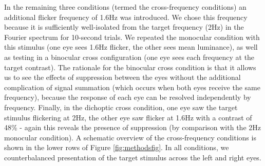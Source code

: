 \documentclass[
]{article}
\begin{document}
In the remaining three conditions (termed the cross-frequency conditions) an additional flicker frequency of 1.6Hz was introduced. We chose this frequency because it is sufficiently well-isolated from the target frequency (2Hz) in the Fourier spectrum for 10-second trials. We repeated the monocular condition with this stimulus (one eye sees 1.6Hz flicker, the other sees mean luminance), as well as testing in a binocular cross configuration (one eye sees each frequency at the target contrast). The rationale for the binocular cross condition is that it allows us to see the effects of suppression between the eyes without the additional complication of signal summation (which occurs when both eyes receive the same frequency), because the response of each eye can be resolved independently by frequency. Finally, in the dichoptic cross condition, one eye saw the target stimulus flickering at 2Hz, the other eye saw flicker at 1.6Hz with a contrast of 48\% - again this reveals the presence of suppression (by comparison with the 2Hz monocular condition). A schematic overview of the cross-frequency conditions is shown in the lower rows of Figure \ref{fig:methodsfig}. In all conditions, we counterbalanced presentation of the target stimulus across the left and right eyes.
\end{document}

